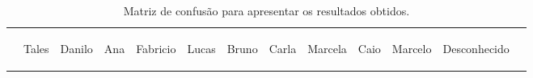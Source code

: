 	\begin{table}[htb]
		\begin{center}
			\caption{Matriz de confusão para apresentar os resultados obtidos.}
			\label{tab:matriz-confusao2}
			  \begin{tabular}{|c|c|c|c|c|c|c|c|c|c|c|c|c|}

				\hline  & \bf \begin{sideways}Tales\end{sideways} & \bf \begin{sideways}Danilo\end{sideways} & \bf \begin{sideways}Ana\end{sideways} & \bf \begin{sideways}Fabricio\end{sideways} & \bf \begin{sideways}Lucas\end{sideways} & \bf \begin{sideways}Bruno\end{sideways} & \bf \begin{sideways}Carla\end{sideways} & \bf \begin{sideways}Marcela\end{sideways} & \bf \begin{sideways}Caio\end{sideways} & \bf \begin{sideways}Marcelo\end{sideways} & \bf \begin{sideways}Desconhecido\end{sideways}\\
				 

\end{tabular}
\end{center}
\end{table}
